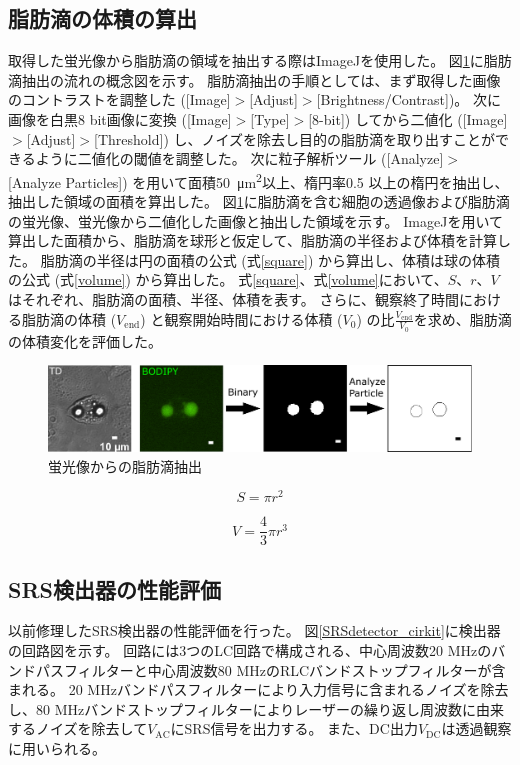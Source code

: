 \documentclass[uplatex,a4paper]{jsarticle}
\begin{document}
\subsection{脂肪滴の体積の算出}
取得した蛍光像から脂肪滴の領域を抽出する際はImageJを使用した。
図\ref{fig:binary}に脂肪滴抽出の流れの概念図を示す。
脂肪滴抽出の手順としては、まず取得した画像のコントラストを調整した ([Image]$>$[Adjust]$>$[Brightness/Contrast])。
次に画像を白黒8 bit画像に変換 ([Image]$>$[Type]$>$[8-bit]) してから二値化 ([Image]$>$[Adjust]$>$[Threshold]) し、ノイズを除去し目的の脂肪滴を取り出すことができるように二値化の閾値を調整した。
次に粒子解析ツール ([Analyze]$>$[Analyze Particles]) を用いて面積\SI{50}{\micro\metre\squared}以上、楕円率0.5 以上の楕円を抽出し、抽出した領域の面積を算出した。
図\ref{fig:binary}に脂肪滴を含む細胞の透過像および脂肪滴の蛍光像、蛍光像から二値化した画像と抽出した領域を示す。
ImageJを用いて算出した面積から、脂肪滴を球形と仮定して、脂肪滴の半径および体積を計算した。
脂肪滴の半径は円の面積の公式 (式\eqref{square}) から算出し、体積は球の体積の公式 (式\eqref{volume}) から算出した。
式\eqref{square}、式\eqref{volume}において、$S$、$r$、$V$はそれぞれ、脂肪滴の面積、半径、体積を表す。
さらに、観察終了時間における脂肪滴の体積 ($V_{\mathrm{end}}$) と観察開始時間における体積 ($V_{\mathrm{0}}$) の比$\frac{V_{\mathrm{end}}}{V_{\mathrm{0}}}$を求め、脂肪滴の体積変化を評価した。

\begin{figure}[H]
	\centering
	\includegraphics[width=15cm,pagebox=cropbox,clip]{figure/2_3_binary.pdf}
	\caption{蛍光像からの脂肪滴抽出	\label{fig:binary}}
\end{figure}

\begin{equation}\label{square}
	S=\pi r^2
\end{equation}

\begin{equation}\label{volume}
	V=\frac{4}{3}\pi r^3
\end{equation}

\subsection{SRS検出器の性能評価}
以前修理したSRS検出器の性能評価を行った。
図\ref{SRSdetector_cirkit}に検出器の回路図を示す。
回路には3つのLC回路で構成される、中心周波数20 MHzのバンドパスフィルターと中心周波数80 MHzのRLCバンドストップフィルターが含まれる。
20 MHzバンドパスフィルターにより入力信号に含まれるノイズを除去し、80 MHzバンドストップフィルターによりレーザーの繰り返し周波数に由来するノイズを除去して$V_{\mathrm{AC}}$にSRS信号を出力する。
また、DC出力$V_{\mathrm{DC}}$は透過観察に用いられる。
\end{document}
